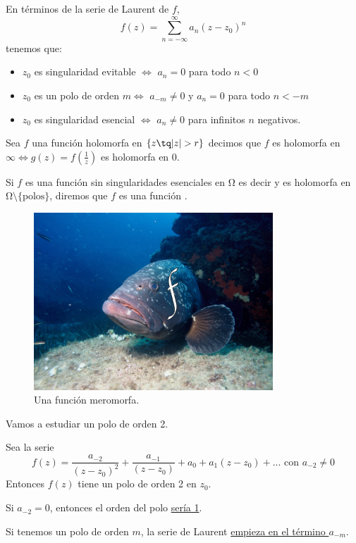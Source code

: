 \documentclass{apuntes}
\begin{document}
En términos de la serie de Laurent de $f$,
\[f(z)=\sum_{n=-\infty}^{\infty}a_n(z-z_0)^n\]
tenemos que:
\begin{itemize}
\item $z_0$ es singularidad evitable $\iff$ $a_n=0$ para todo $n < 0$
\item $z_0$ es un polo de orden $m \iff$ $a_{-m} \neq 0$ y $a_n=0$ para todo $n < -m$
\item $z_0$ es singularidad esencial $\iff$ $a_n \neq 0$ para infinitos $n$ negativos.
\end{itemize}

\obs Sea $f$ una función holomorfa en $\{z \tq |z| > r\}$ decimos que $f$ es holomorfa en $\infty \iff g(z)=f\left(\frac{1}{z}\right)$  es holomorfa en 0.

Si $f$ es una función sin singularidades esenciales en Ω es decir y es holomorfa en Ω$\setminus\{\text{polos}\}$, diremos que $f$ es una función .

\begin{figure}[hbtp]
\centering
\includegraphics[width=0.8\textwidth]{img/FMeromorfa.jpg}
\caption{Una función meromorfa.}
\end{figure}

\begin{example} Vamos a estudiar un polo de orden 2.

Sea la serie
\[ f(z) = \frac{a_{-2}}{(z - z_0)^2} + \frac{a_{-1}}{(z - z_0)} + a_0 + a_1 (z - z_0) + ... \text{ con } a_{-2} \neq 0\]
Entonces $f(z)$ tiene un polo de orden 2 en $z_0$.

\obs Si $a_{-2} = 0$, entonces el orden del polo \underline{sería 1}.

 Si tenemos un polo de orden $m$, la serie de Laurent \underline{empieza en el término $a_{-m}$}.
\end{example}
\end{document}
